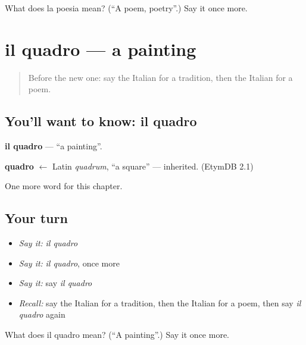 \begin{tcolorbox}[breakable,colback=teal!4,colframe=teal!35!black,title={Before you move on}]
What does la poesia mean? (\textquotedblleft{}A poem, poetry\textquotedblright{}.) Say it once more.
\end{tcolorbox}
\section[il quadro]{il quadro — a painting}

\label{lesson:IT-C223-quadro}



\begin{quote}
Before the new one: say the Italian for a tradition, then the Italian for a poem.
\end{quote}

\subsection*{You'll want to know: il quadro}
\textbf{il quadro} — \textquotedblleft{}a painting\textquotedblright{}.

\begin{cousinweb}
\textbf{quadro} $\leftarrow$ Latin \emph{quadrum}, \textquotedblleft{}a square\textquotedblright{} — inherited. (EtymDB 2.1)
\end{cousinweb}

\begin{grammarlens}[title={What you've built}]
One more word for this chapter.
\end{grammarlens}

\subsection*{Your turn}
\begin{itemize}
\raggedright
  \item \emph{Say it:} \emph{il quadro}
  \item \emph{Say it:} \emph{il quadro}, once more
  \item \emph{Say it:} say \emph{il quadro}
  \item \emph{Recall:} say the Italian for a tradition, then the Italian for a poem, then say \emph{il quadro} again
\end{itemize}

\begin{tcolorbox}[breakable,colback=teal!4,colframe=teal!35!black,title={Before you move on}]
What does il quadro mean? (\textquotedblleft{}A painting\textquotedblright{}.) Say it once more.
\end{tcolorbox}
